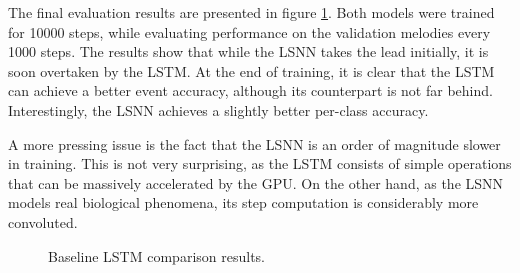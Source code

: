 \documentclass[../../report.tex]{subfiles}
\begin{document}
The final evaluation results are presented in figure \ref{fig:final-results}.
Both models were trained for \num{10000} steps, while evaluating performance on
the validation melodies every \num{1000} steps. The results show that while the
LSNN takes the lead initially, it is soon overtaken by the LSTM. At the end of
training, it is clear that the LSTM can achieve a better event accuracy,
although its counterpart is not far behind. Interestingly, the LSNN achieves a
slightly better per-class accuracy.

A more pressing issue is the fact that the LSNN is an order of magnitude slower
in training. This is not very surprising, as the LSTM consists of simple
operations that can be massively accelerated by the GPU. On the other hand, as
the LSNN models real biological phenomena, its step computation is considerably
more convoluted.

\begin{figure}
  \centering
  \caption{Baseline LSTM comparison results.}
  \label{fig:final-results}
\end{figure}
\end{document}
